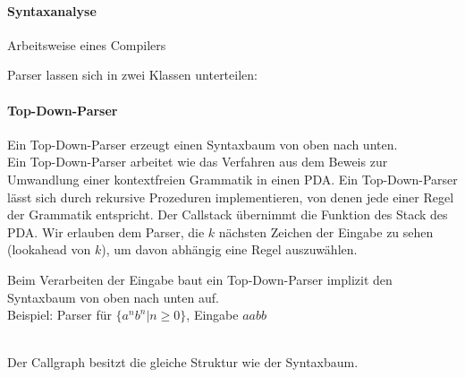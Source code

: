 \documentclass[a4paper]{scrartcl}
\begin{document}
\paragraph{Syntaxanalyse}
Arbeitsweise eines Compilers\\

Parser lassen sich in zwei Klassen unterteilen:

\paragraph{Top-Down-Parser} Ein Top-Down-Parser erzeugt einen Syntaxbaum von oben nach unten.\\
Ein Top-Down-Parser arbeitet wie das Verfahren aus dem Beweis zur Umwandlung einer kontextfreien Grammatik in einen PDA. Ein Top-Down-Parser lässt sich durch rekursive Prozeduren implementieren, von denen jede einer Regel der Grammatik entspricht. Der Callstack übernimmt die Funktion des Stack des PDA. Wir erlauben dem Parser, die $k$ nächsten Zeichen der Eingabe zu sehen (lookahead von $k$), um davon abhängig eine Regel auszuwählen.

Beim Verarbeiten der Eingabe baut ein Top-Down-Parser implizit den Syntaxbaum von oben nach unten auf.\\
Beispiel: Parser für $\{ a^nb^n | n \geq 0 \}$, Eingabe $aabb$\\
\\
Der Callgraph besitzt die gleiche Struktur wie der Syntaxbaum.
\end{document}
